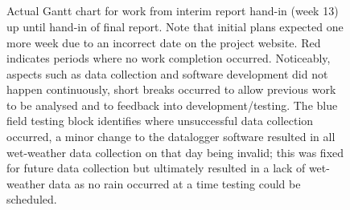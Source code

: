 \vspace*{\fill}
\begin{figure}[H]
\centering
\begin{ganttchart}{1}{21}
   \\
   \\
   \\
 \\
 \\
   \\
  \\
 \\
 \\
 \\
 \\
 \\
 \\
 \\
\end{ganttchart}
\caption[Actual progress Gantt chart]{Actual Gantt chart for work from interim report hand-in (week 13) up until hand-in of final report. Note that initial plans expected one more week due to an incorrect date on the project website. Red indicates periods where no work completion occurred. Noticeably, aspects such as data collection and software development did not happen continuously, short breaks occurred to allow previous work to be analysed and to feedback into development/testing. The blue field testing block identifies where unsuccessful data collection occurred, a minor change to the datalogger software resulted in all wet-weather data collection on that day being invalid; this was fixed for future data collection but ultimately resulted in a lack of wet-weather data as no rain occurred at a time testing could be scheduled.
}
\label{fig:actual_gantt_chart}
\end{figure}
\vspace*{\fill}





